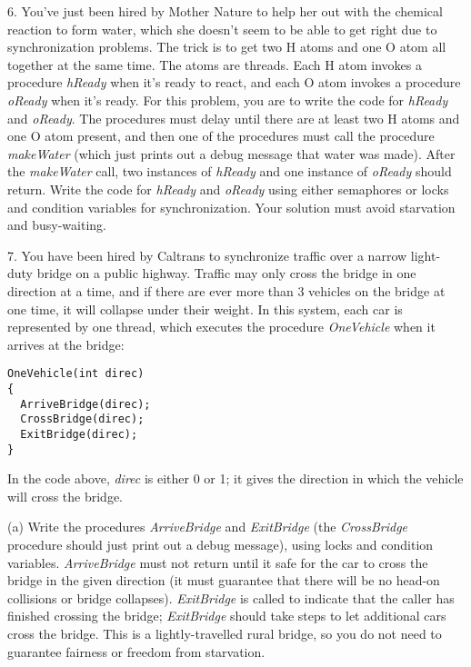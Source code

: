 \begin{description}
\item{6.} You've just been hired by Mother Nature to help her out with the
chemical reaction to form water, which she doesn't seem to be
able to get right due to synchronization problems.  The trick is to
get two H atoms and one O atom all together at the same time.  The
atoms are threads.  Each H atom invokes a procedure {\em hReady} when it's
ready to react, and each O atom invokes a procedure {\em oReady}
when it's ready.  For this problem, you are to write the code for
{\em hReady} and {\em oReady}.  The procedures must delay until there
are at least two H atoms and one O atom present, and then one
of the procedures must call the procedure {\em makeWater} (which
just prints out a debug message that water was made).
After the {\em makeWater} call, two
instances of {\em hReady} and one instance of {\em oReady} should return.
Write the code for {\em hReady} and {\em oReady} using
either semaphores or locks and condition variables for synchronization.
Your solution must avoid starvation and busy-waiting.

\item{7.} You have been hired by Caltrans to synchronize traffic over a
narrow light-duty bridge on a public highway.  Traffic may only cross
the bridge in one direction at a time, and if there are ever more than
3 vehicles on the bridge at one time, it will collapse  under their
weight.  In this system, each car is represented by one thread,
which executes the procedure {\em OneVehicle} when it arrives
at the bridge:

\begin{verbatim}
OneVehicle(int direc)
{
  ArriveBridge(direc);
  CrossBridge(direc);
  ExitBridge(direc);
}
\end{verbatim}

In the code above, {\em direc} is either 0 or 1;  it gives the
direction in which the vehicle will cross the bridge.

\begin{description}

\item{(a)} Write the procedures {\em ArriveBridge}
and {\em ExitBridge} (the {\em CrossBridge} procedure should just print
out a debug message), using locks and condition variables.  {\em ArriveBridge}
must not return until it safe
for the car to cross the bridge in the given direction (it
must guarantee that there will be no head-on collisions or
bridge collapses).  {\em ExitBridge} is called to indicate
that the caller has finished crossing the bridge;  {\em ExitBridge}
should take steps to let additional cars cross the bridge.
This is a lightly-travelled rural bridge, so
you do not need to guarantee fairness or freedom from starvation.


\end{description}
\end{description}
